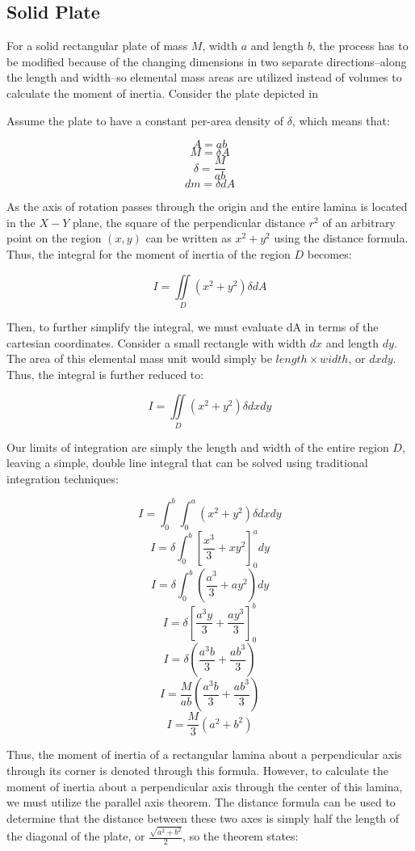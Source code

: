 \subsection{Solid Plate}

For a solid rectangular plate of mass $M$, width $a$ and length $b$, the process has to be modified because of the changing dimensions in two separate directions--along the length and width--so elemental mass areas are utilized instead of volumes to calculate the moment of inertia. Consider the plate depicted in 


Assume the plate to have a constant per-area density of $\delta$, which means that:

\[A = ab\]
\[M = \delta A\]
\[\delta = \frac{M}{ab}\]
\[dm = \delta dA\]


As the axis of rotation passes through the origin and the entire lamina is located in the $X-Y$ plane, the square of the perpendicular distance $r^2$ of an arbitrary point on the region $(x, y)$ can be written as $x^2+y^2$ using the distance formula. Thus, the integral for the moment of inertia of the region $D$ becomes:

\[I = \iint\limits_{D} (x^2+y^2)\delta dA\]

Then, to further simplify the integral, we must evaluate dA in terms of the cartesian coordinates. Consider a small rectangle with width $dx$ and length $dy$. The area of this elemental mass unit would simply be $length \times width$, or $dxdy$. Thus, the integral is further reduced to:

\[I = \iint\limits_{D} (x^2+y^2)\delta dxdy\]

Our limits of integration are simply the length and width of the entire region $D$, leaving a simple, double line integral that can be solved using traditional integration techniques:

\[I = \int_0^b\int_0^a (x^2+y^2)\delta dxdy\]
\[I = \delta\int_0^b\left[\frac{x^3}{3}+xy^2\right]_0^a dy\]
\[I = \delta\int_0^b\left(\frac{a^3}{3}+ay^2\right) dy\]
\[I = \delta\left[\frac{a^3y}{3}+\frac{ay^3}{3}\right]_0^b\]
\[I = \delta\left(\frac{a^3b}{3}+\frac{ab^3}{3}\right)\]
\[I = \frac{M}{ab}\left(\frac{a^3b}{3}+\frac{ab^3}{3}\right)\]
\[I = \frac{M}{3}\left(a^2+b^2\right)\]

Thus, the moment of inertia of a rectangular lamina about a perpendicular axis through its corner is denoted through this formula. However, to calculate the moment of inertia about a perpendicular axis through the center of this lamina, we must utilize the parallel axis theorem. The distance formula can be used to determine that the distance between these two axes is simply half the length of the diagonal of the plate, or $\frac{\sqrt{a^2+b^2}}{2}$, so the theorem states:

